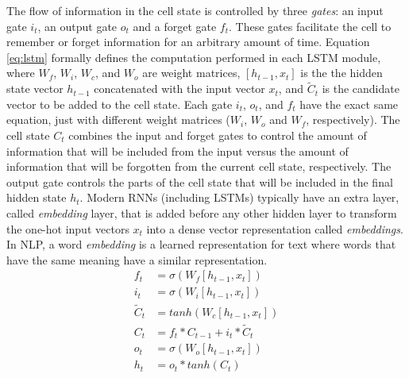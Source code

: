 The flow of information in the cell state is controlled by three \textit{gates}: an input gate $i_t$, an output gate $o_t$ and a forget gate $f_t$. These gates facilitate the cell to remember or forget information for an arbitrary amount of time. Equation \ref{eq:lstm} formally defines the computation performed in each LSTM module, where $W_f$, $W_i$, $W_c$, and $W_o$ are weight matrices, $[h_{t-1}, x_t]$ is the the hidden state vector $h_{t-1}$ concatenated with the input vector $x_t$, and $\tilde{C}_t$ is the candidate vector to be added to the cell state. Each gate $i_t$, $o_t$, and $f_t$ have the exact same equation, just with different weight matrices ($W_i$, $W_o$ and $W_f$, respectively). The cell state $C_t$ combines the input and forget gates to control the amount of information that will be included from the input versus the amount of information that will be forgotten from the current cell state, respectively. The output gate controls the parts of the cell state that will be included in the final hidden state $h_t$. Modern RNNs (including LSTMs) typically have an extra layer, called \textit{embedding} layer, that is added before any other hidden layer to transform the one-hot input vectors $x_t$ into a dense vector representation called \textit{embeddings}. In NLP, a word \textit{embedding} is a learned representation for text where words that have the same meaning have a similar representation.
\begin{equation} \label{eq:lstm}
\begin{split}
    f_t &= \sigma(W_f[h_{t-1}, x_t]) \\
    i_t &= \sigma(W_i[h_{t-1}, x_t]) \\
    \tilde{C}_t &= tanh(W_c[h_{t-1},x_t]) \\
    C_t &= f_t * C_{t-1} + i_t * \tilde{C}_t \\
    o_t &= \sigma(W_o[h_{t-1}, x_t]) \\
    h_t &= o_t * tanh(C_t)
\end{split}
\end{equation}


